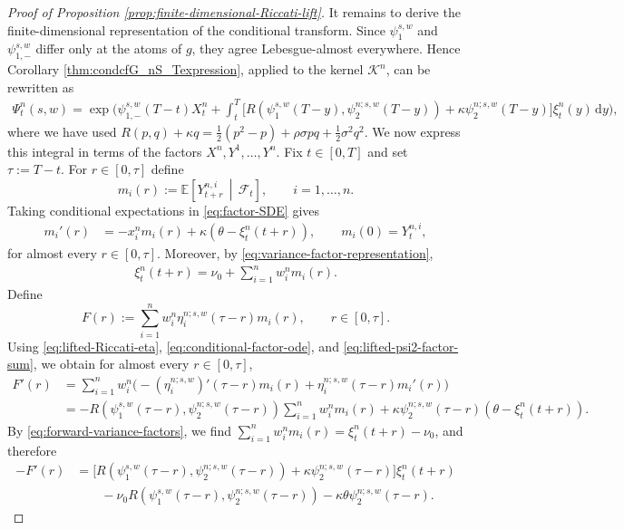 \documentclass[10pt,a4paper,reqno]{amsart}
\theoremstyle{plain}
\theoremstyle{definition}
\theoremstyle{remark}
\theoremstyle{example}
\begin{document}
\begin{proof}[Proof of Proposition \ref{prop:finite-dimensional-Riccati-lift}]
It remains to derive the finite-dimensional representation of the conditional transform. Since $\psi_1^{s,w}$ and $\psi_{1,-}^{s,w}$ differ only at the atoms of $g$, they agree Lebesgue-almost everywhere. Hence Corollary \ref{thm:condcfG_nS_Texpression}, applied to the kernel $\mathcal K^n$, can be rewritten as
\begin{align*}
\Psi_t^n(s,w) = \exp\Bigg( \psi_{1,-}^{s,w}(T-t)X_t^n + \int_t^T \Big[ R\left( \psi_1^{s,w}(T-y), \psi_2^{n;s,w}(T-y) \right) + \kappa\psi_2^{n;s,w}(T-y) \Big] \xi_t^n(y)\,\mathrm dy \Bigg),
\end{align*}
where we have used $R(p,q)+\kappa q = \frac12(p^2-p) + \rho\sigma pq + \frac12\sigma^2q^2$. We now express this integral in terms of the factors $X^n, Y^1,\dots, Y^n$. Fix $t\in[0,T]$ and set $\tau:=T-t$. For $r\in[0,\tau]$ define
\[ 
    m_i(r) := \mathbb E\left[ Y_{t+r}^{n,i} \,\middle|\, \mathcal F_t \right], \qquad i=1,\dots,n.
\]
Taking conditional expectations in \eqref{eq:factor-SDE} gives 
\begin{align}\label{eq:conditional-factor-ode}
m_i'(r) &= -x_i^n m_i(r) + \kappa\left( \theta-\xi_t^n(t+r) \right), \qquad m_i(0)=Y_t^{n,i},
\end{align}
for almost every $r\in[0,\tau]$. Moreover, by \eqref{eq:variance-factor-representation},
\begin{align}\label{eq:forward-variance-factors}
\xi_t^n(t+r) = \nu_0 + \sum_{i=1}^n w_i^n m_i(r).
\end{align}
Define
\[
    F(r) := \sum_{i=1}^n w_i^n \eta_i^{n;s,w}(\tau-r)m_i(r), \qquad r\in[0,\tau].
\]
Using \eqref{eq:lifted-Riccati-eta}, \eqref{eq:conditional-factor-ode}, and \eqref{eq:lifted-psi2-factor-sum}, we obtain for almost every $r\in[0,\tau]$,
\begin{align*}
F'(r) &= \sum_{i=1}^n w_i^n \Big( -(\eta_i^{n;s,w})'(\tau-r)m_i(r) + \eta_i^{n;s,w}(\tau- r)m_i'(r) \Big)
\\ &= -R\left( \psi_1^{s,w}(\tau-r), \psi_2^{n;s,w}(\tau-r) \right) \sum_{i=1}^n w_i^n m_i(r) + \kappa \psi_2^{n;s,w}(\tau-r) \left( \theta-\xi_t^n(t+r) \right).
\end{align*}
By \eqref{eq:forward-variance-factors}, we find $\sum_{i=1}^n w_i^n m_i(r) = \xi_t^n(t+r)-\nu_0$, and therefore
\begin{align*}
-F'(r) &= \Bigg[ R\left( \psi_1^{s,w}(\tau-r), \psi_2^{n;s,w}(\tau-r) \right) + \kappa\psi_2^{n;s,w}(\tau-r) \Bigg] \xi_t^n(t+r)
\\ &\qquad - \nu_0 R\left( \psi_1^{s,w}(\tau-r), \psi_2^{n;s,w}(\tau-r)\right) - \kappa\theta \psi_2^{n;s,w}(\tau-r).

\end{align*}
\end{proof}
\end{document}
